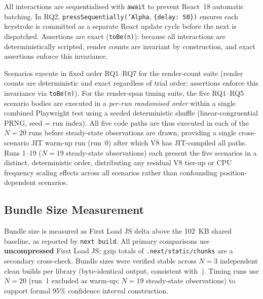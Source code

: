 \documentclass[conference]{IEEEtran}
\newcommand{\code}[1]{\texttt{\small #1}}
\begin{document}
All interactions are sequentialised with \code{await} to prevent
React~18 automatic batching. In RQ2, \code{pressSequentially('Alpha},
\code{\{delay: 50\})} ensures each keystroke is committed as a separate
React update cycle before the next is dispatched. Assertions are exact
(\code{toBe(n)}): because all interactions are deterministically
scripted, render counts are invariant by construction, and exact
assertions enforce this invariance.

Scenarios execute in fixed order RQ1--RQ7 for the render-count suite
(render counts are deterministic and exact regardless of trial order;
assertions enforce this invariance via \code{toBe(n)}). For the
render-span timing suite, the five RQ1--RQ5 scenario bodies are
executed in a \emph{per-run randomised order} within a single combined
Playwright test using a seeded deterministic shuffle
(linear-congruential PRNG, seed = run index). All five code paths are
thus executed in each of the $N{=}20$ runs before steady-state
observations are drawn, providing a single cross-scenario JIT warm-up
run (run~0) after which V8 has JIT-compiled all paths. Runs 1--19
($N{=}19$ steady-state observations) each present the five scenarios in
a distinct, deterministic order, distributing any residual V8
tier-up or CPU frequency scaling effects across all scenarios rather
than confounding position-dependent scenarios.

\subsection{Bundle Size Measurement}
\label{sec:environment}

Bundle size is measured as First Load JS delta above the 102~KB shared
baseline, as reported by \code{next build}. All primary comparisons use
\textbf{uncompressed} First Load JS; gzip totals of
\code{.next/static/chunks} are a secondary cross-check. Bundle sizes
were verified stable across $N{=}3$ independent clean builds per library
(byte-identical output, consistent with~\cite{b10}). Timing runs use
$N{=}20$ (run~1 excluded as warm-up; $N{=}19$ steady-state observations)
to support formal 95\% confidence interval construction.
\end{document}
